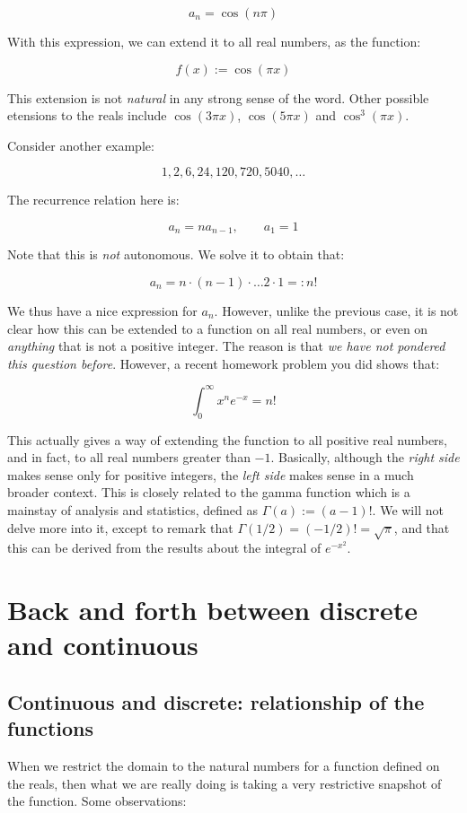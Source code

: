 \documentclass[10pt]{amsart}
\begin{document}
$$a_n = \cos(n\pi)$$

With this expression, we can extend it to all real numbers, as the function:

$$f(x) := \cos(\pi x)$$

This extension is not {\em natural} in any strong sense of the
word. Other possible etensions to the reals include $\cos(3\pi x)$,
$\cos(5\pi x)$ and $\cos^3(\pi x)$.

Consider another example:

$$1,2,6,24,120,720,5040,\dots$$

The recurrence relation here is:

$$a_n = na_{n-1}, \qquad a_1 = 1$$

Note that this is {\em not} autonomous. We solve it to obtain that:

$$a_n = n \cdot (n - 1) \cdot \dots 2 \cdot 1 =: n!$$

We thus have a nice expression for $a_n$. However, unlike the previous
case, it is not clear how this can be extended to a function on all
real numbers, or even on {\em anything} that is not a positive
integer. The reason is that {\em we have not pondered this question
before}. However, a recent homework problem you did shows that:

$$\int_0^\infty x^ne^{-x} = n!$$

This actually gives a way of extending the function to all positive
real numbers, and in fact, to all real numbers greater than
$-1$. Basically, although the {\em right side} makes sense only for
positive integers, the {\em left side} makes sense in a much broader
context. This is closely related to the gamma function which is a
mainstay of analysis and statistics, defined as $\Gamma(a) := (a -
1)!$. We will not delve more into it, except to remark that
$\Gamma(1/2) = (-1/2)! = \sqrt{\pi}$, and that this can be derived
from the results about the integral of $e^{-x^2}$. 

\section{Back and forth between discrete and continuous}

\subsection{Continuous and discrete: relationship of the functions}

When we restrict the domain to the natural numbers for a function
defined on the reals, then what we are really doing is taking a very
restrictive snapshot of the function. Some observations:
\end{document}
